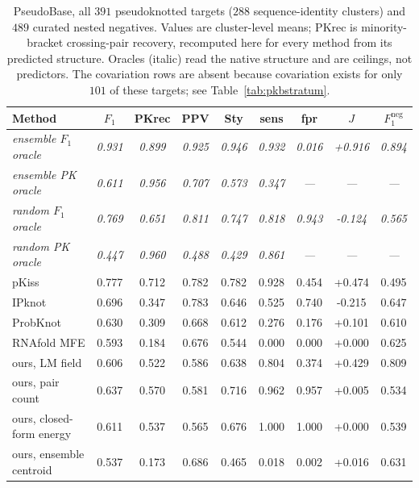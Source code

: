 \begin{table}[!t]
\caption{PseudoBase, all $391$ pseudoknotted targets ($288$ sequence-identity clusters) and $489$ curated nested negatives. Values are cluster-level means; PKrec is minority-bracket crossing-pair recovery, recomputed here for every method from its predicted structure. Oracles (italic) read the native structure and are ceilings, not predictors. The covariation rows are absent because covariation exists for only $101$ of these targets; see Table~\ref{tab:pkbstratum}.}
\label{tab:pseudobase}
\centering
\footnotesize
\setlength{\tabcolsep}{5pt}
\begin{tabular}{lcccccccc}
\toprule
Method & $F_1$ & PKrec & PPV & Sty & sens & fpr & $J$ & $F_1^{\mathrm{neg}}$ \\
\midrule
\textit{ensemble $F_1$ oracle} & \textit{0.931} & \textit{0.899} & \textit{0.925} & \textit{0.946} & \textit{0.932} & \textit{0.016} & \textit{+0.916} & \textit{0.894} \\
\textit{ensemble PK oracle} & \textit{0.611} & \textit{0.956} & \textit{0.707} & \textit{0.573} & \textit{0.347} & \textit{---} & \textit{---} & \textit{---} \\
\textit{random $F_1$ oracle} & \textit{0.769} & \textit{0.651} & \textit{0.811} & \textit{0.747} & \textit{0.818} & \textit{0.943} & \textit{-0.124} & \textit{0.565} \\
\textit{random PK oracle} & \textit{0.447} & \textit{0.960} & \textit{0.488} & \textit{0.429} & \textit{0.861} & \textit{---} & \textit{---} & \textit{---} \\
\midrule
pKiss & 0.777 & 0.712 & 0.782 & 0.782 & 0.928 & 0.454 & +0.474 & 0.495 \\
IPknot & 0.696 & 0.347 & 0.783 & 0.646 & 0.525 & 0.740 & -0.215 & 0.647 \\
ProbKnot & 0.630 & 0.309 & 0.668 & 0.612 & 0.276 & 0.176 & +0.101 & 0.610 \\
RNAfold MFE & 0.593 & 0.184 & 0.676 & 0.544 & 0.000 & 0.000 & +0.000 & 0.625 \\
ours, LM field & 0.606 & 0.522 & 0.586 & 0.638 & 0.804 & 0.374 & +0.429 & 0.809 \\
ours, pair count & 0.637 & 0.570 & 0.581 & 0.716 & 0.962 & 0.957 & +0.005 & 0.534 \\
ours, closed-form energy & 0.611 & 0.537 & 0.565 & 0.676 & 1.000 & 1.000 & +0.000 & 0.539 \\
ours, ensemble centroid & 0.537 & 0.173 & 0.686 & 0.465 & 0.018 & 0.002 & +0.016 & 0.631 \\
\bottomrule
\end{tabular}
\end{table}

